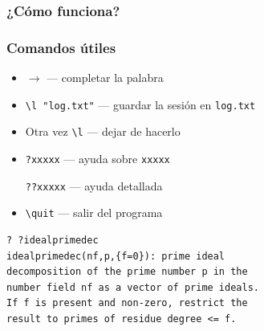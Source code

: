 \documentclass{beamer}
\begin{document}
\begin{frame}
  \frametitle{¿Cómo funciona?}

  \begin{center}\setlength{\fboxsep}{0pt}\setlength{\fboxrule}{0.5pt}
  \end{center}

\end{frame}


\begin{frame}[fragile]
  \frametitle{Comandos útiles}

  \begin{itemize}
  \item $\boxed{\rightarrow}$ --- completar la palabra

  \item \texttt{\textbackslash{}l "log.txt"} --- guardar la sesión en
    \texttt{log.txt}

  \item Otra vez \texttt{\textbackslash{}l} --- dejar de hacerlo

  \item \texttt{?xxxxx} --- ayuda sobre \texttt{xxxxx}

    \texttt{??xxxxx} --- ayuda detallada

  \item \texttt{\textbackslash{}quit} --- salir del programa
  \end{itemize}

  \begin{shaded}\small
\begin{verbatim}
? ?idealprimedec
idealprimedec(nf,p,{f=0}): prime ideal 
decomposition of the prime number p in the 
number field nf as a vector of prime ideals. 
If f is present and non-zero, restrict the 
result to primes of residue degree <= f.
\end{verbatim}
\end{shaded}
\end{frame}
\end{document}
